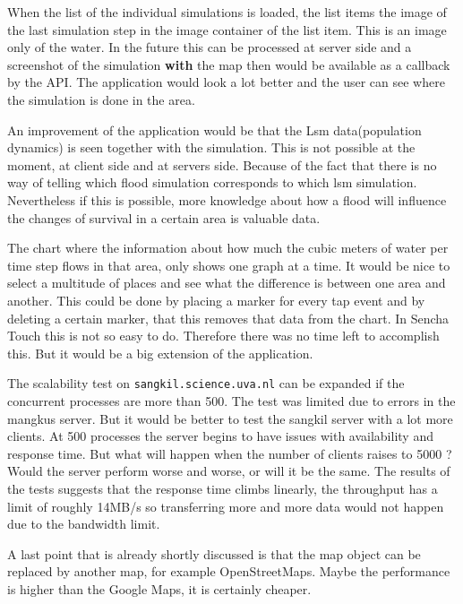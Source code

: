 When the list of the individual simulations is loaded, the list items the image of the last simulation step in the image container of the list item. This is an image only of the water. In the future this can be processed at server side and a screenshot of the simulation \textbf{with} the map then would be available as a callback by the API. The application would look a lot better and the user can see where the simulation is done in the area. 

An improvement of the application would be that the Lsm data(population dynamics) is seen together with the simulation. This is not possible at the moment, at client side and at servers side. Because of the fact that there is no way of telling which flood simulation corresponds to which lsm simulation. Nevertheless if this is possible, more knowledge about how a flood will influence the changes of survival in a certain area is valuable data. 

The chart where the information about how much the cubic meters of water per time step flows in that area, only shows one graph at a time. It would be nice to select a multitude of places and see what the difference is between one area and another. This could be done by placing a marker for every tap event and by deleting a certain marker, that this removes that data from the chart. In Sencha Touch this is not so easy to do. Therefore there was no time left to accomplish this. But it would be a big extension of the application.

The scalability test on \texttt{sangkil.science.uva.nl} can be expanded if the concurrent processes are more than 500. The test was limited due to errors in the mangkus server. But it would be better to test the sangkil server with a lot more clients. At 500 processes the server begins to have issues with availability and response time. But what will happen when the number of clients raises to 5000 ? Would the server perform worse and worse, or will it be the same. The results of the tests suggests that the response time climbs linearly, the throughput has a limit of roughly 14MB/s so transferring more and more data would not happen due to the bandwidth limit. 

A last point that is already shortly discussed is that the map object can be replaced by another map, for example OpenStreetMaps. Maybe the performance is higher than the Google Maps, it is certainly cheaper.




